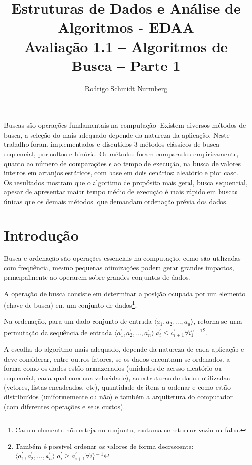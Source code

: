 \documentclass[12pt]{article}
\title{Estruturas de Dados e Análise de Algoritmos - EDAA\\ Avaliação 1.1 – Algoritmos de Busca – Parte 1}
\author{Rodrigo Schmidt Nurmberg\inst{1}}
\begin{document}
 

\maketitle

\begin{resumo} 
Buscas são operações fundamentais na computação. Existem diversos métodos de busca, a seleção do mais adequado depende da natureza da aplicação. Neste trabalho foram implementados e discutidos 3 métodos clássicos de busca: sequencial, por saltos e binária.
Os métodos foram comparados empiricamente, quanto ao número de comparações e ao tempo de execução, na busca de valores inteiros em arranjos estáticos, com base em dois cenários: aleatório e pior caso. Os resultados mostram que o algoritmo de propósito mais geral, busca sequencial, apesar de apresentar maior tempo médio de execução é mais rápido em buscas únicas que os demais métodos, que demandam ordenação prévia dos dados.
\end{resumo}

\section{Introdução}

Busca e ordenação são operações essenciais na computação, como são utilizadas com frequência, mesmo pequenas otimizações podem gerar grandes impactos, principalmente ao operarem sobre grandes conjuntos de dados.

A operação de busca consiste em determinar a posição ocupada por um elemento (chave de busca) em um conjunto de dados\footnote{Caso o elemento não esteja no conjunto, costuma-se retornar vazio ou falso.}.

Na ordenação, para um dado conjunto de entrada $\langle a_{1}, a_{2}, ..., a_{n} \rangle$, retorna-se uma permutação da sequência de entrada $\langle a^{'}_{1}, a^{'}_{2}, ..., a^{'}_{n} \rangle \vert a^{'}_{i} \leq a^{'}_{i+1} \forall i_{1}^{n-1}$\cite{cormen_algoritmos:_2012}\footnote{Também é possível ordenar os valores de forma decrescente: $\langle a^{'}_{1}, a^{'}_{2}, ..., a^{'}_{n} \rangle \vert a^{'}_{i} \geq a^{'}_{i+1} \forall i_{1}^{n-1}$}.

A escolha do algoritmo mais adequado, depende da natureza de cada aplicação e deve considerar, entre outros fatores, se os dados encontram-se ordenados, a forma como os dados estão armazenados (unidades de acesso aleatório ou sequencial, cada qual com sua velocidade), as estruturas de dados utilizadas (vetores, listas encadeadas, etc), quantidade de itens a ordenar e como estão distribuídos (uniformemente ou não) e também a arquitetura do computador (com diferentes operações e seus custos).
\end{document}
